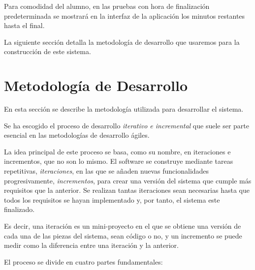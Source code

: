 Para comodidad del alumno, en las pruebas con hora de finalización predeterminada se mostrará en la interfaz de la aplicación los minutos restantes hasta el final.
\newline


La siguiente sección detalla la metodología de desarrollo que usaremos para la construcción de este sistema.

\section{Metodología de Desarrollo}
\label{sec:planificacion:metodologia}


En esta sección se describe la metodología utilizada para desarrollar el sistema.
\newline

Se ha escogido el proceso de desarrollo \emph{iterativo e incremental} que suele ser parte esencial en las metodologías de desarrollo ágiles.
\newline

La idea principal de este proceso se basa, como su nombre, en iteraciones e incrementos, que no son lo mismo.
El software se construye mediante tareas repetitivas, \emph{iteraciones}, en las que se añaden nuevas funcionalidades progresivamente, \emph{incrementos}, para crear una versión del sistema que cumple más requisitos que la anterior. Se realizan tantas iteraciones sean necesarias hasta que todos los requisitos se hayan implementado y, por tanto, el sistema este finalizado.

Es decir, una iteración es un mini-proyecto en el que se obtiene una versión de cada una de las piezas del sistema, sean código o no, y un incremento se puede medir como la diferencia entre una iteración y la anterior.
\newline

El proceso se divide en cuatro partes fundamentales:

